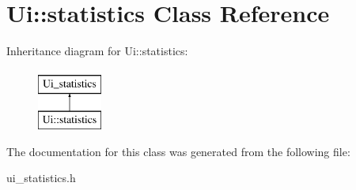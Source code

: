\hypertarget{classUi_1_1statistics}{
\section{Ui::statistics Class Reference}
\label{classUi_1_1statistics}
}
Inheritance diagram for Ui::statistics:\begin{figure}[H]
\begin{center}
\leavevmode
\includegraphics[height=2.000000cm]{classUi_1_1statistics}
\end{center}
\end{figure}


The documentation for this class was generated from the following file:\begin{DoxyCompactItemize}
\item 
ui\_\-statistics.h\end{DoxyCompactItemize}
